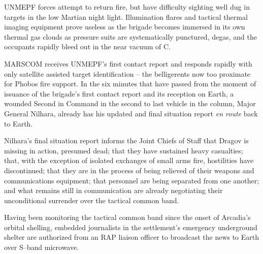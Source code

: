 UNMEPF forces attempt to return fire, but have difficulty sighting well dug in targets in the low Martian night light. Illumination flares and tactical thermal imaging equipment prove useless as the brigade becomes immersed in its own thermal gas clouds as pressure suits are systematically punctured, degas, and the occupants rapidly bleed out in the near vacuum of C.

MARSCOM receives UNMEPF's first contact report and responds rapidly with only satellite assisted target identification -- the belligerents now too proximate for Phobos fire support. In the six minutes that have passed from the moment of issuance of the brigade's first contact report and its reception on Earth, a wounded Second in Command in the second to last vehicle in the column, Major General Nilhara, already has his updated and final situation report {\it en route} back to Earth.

Nilhara's final situation report informs the Joint Chiefs of Staff that Dragov is missing in action, presumed dead; that they have sustained heavy casualties; that, with the exception of isolated exchanges of small arms fire, hostilities have discontinued; that they are in the process of being relieved of their weapons and communications equipment; that personnel are being separated from one another; and what remains still in communication are already negotiating their unconditional surrender over the tactical common band.

Having been monitoring the tactical common band since the onset of Arcadia's orbital shelling, embedded journalists in the settlement's emergency underground shelter are authorized from an RAP liaison officer to broadcast the news to Earth over S--band microwave.
\StopTimelineDate

